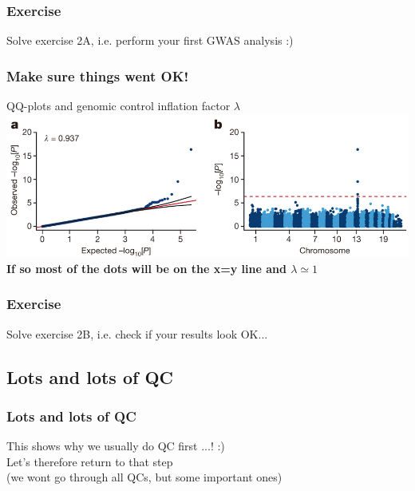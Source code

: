 \documentclass[xcolor=pdftex,dvipsnames,table,10pt]{beamer}
\begin{document}
\begin{frame}
  \frametitle{Exercise}
  Solve exercise 2A, i.e. perform your first GWAS analysis :)
\end{frame}


\begin{frame}
  \frametitle{Make sure things went OK!}
\begin{block}{QQ-plots and genomic control inflation factor $\lambda$}
      \vspace{0.4cm}
      \scalebox{0.42} {
        \includegraphics[trim = 0mm 0mm 170mm 12.55mm, clip]{nature13425-f2.jpg}   
      }\\\vspace{0.2cm}
\textbf{If so most of the dots will be on the x=y line and $\lambda\simeq1$}
\end{block}

\end{frame}

\begin{frame}
  \frametitle{Exercise}
  \small Solve exercise 2B, i.e. check if your results look OK...
\end{frame}

\subsection{Lots and lots of QC}

\begin{frame}
\frametitle{Lots and lots of QC}
\vspace{-.9cm}
\small
This shows why we usually do QC first ...! :)\\\vspace{0.2cm}
Let's therefore return to that step\\
(we wont go through all QCs, but some important ones)
\end{frame}
\end{document}
